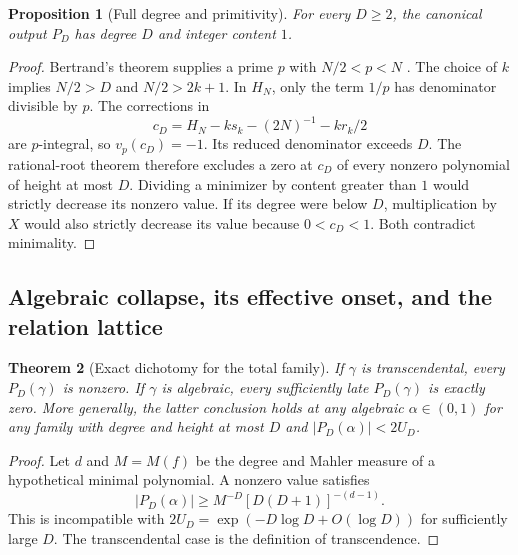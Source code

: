 \documentclass[11pt,a4paper]{article}
\newtheorem{theorem}{Theorem}[section]
\newtheorem{proposition}[theorem]{Proposition}
\theoremstyle{definition}
\theoremstyle{remark}
\numberwithin{equation}{section}
\begin{document}
\begin{proposition}[Full degree and primitivity]\label{inf:prop:full-degree}
For every $D\ge2$, the canonical output $P_D$ has degree $D$ and integer content $1$.
\end{proposition}
\begin{proof}
Bertrand's theorem supplies a prime $p$ with $N/2<p<N$ \cite{inf:Erdos}. The choice of $k$ implies $N/2>D$ and $N/2>2k+1$. In $H_N$, only the term $1/p$ has denominator divisible by $p$. The corrections in
\[
 c_D=H_N-ks_k-(2N)^{-1}-kr_k/2
\]
are $p$-integral, so $v_p(c_D)=-1$. Its reduced denominator exceeds $D$. The rational-root theorem therefore excludes a zero at $c_D$ of every nonzero polynomial of height at most $D$. Dividing a minimizer by content greater than $1$ would strictly decrease its nonzero value. If its degree were below $D$, multiplication by $X$ would also strictly decrease its value because $0<c_D<1$. Both contradict minimality.
\end{proof}

\subsection{Algebraic collapse, its effective onset, and the relation lattice}
\label{inf:sub:collapse}

\begin{theorem}[Exact dichotomy for the total family]\label{inf:thm:dichotomy}
If $\gamma$ is transcendental, every $P_D(\gamma)$ is nonzero. If $\gamma$ is algebraic, every sufficiently late $P_D(\gamma)$ is exactly zero. More generally, the latter conclusion holds at any algebraic $\alpha\in(0,1)$ for any family with degree and height at most $D$ and $|P_D(\alpha)|<2U_D$.
\end{theorem}
\begin{proof}
Let $d$ and $M=M(f)$ be the degree and Mahler measure of a hypothetical minimal polynomial. A nonzero value satisfies
\begin{equation}\label{inf:eq:collapse-bound}
 |P_D(\alpha)|\ge M^{-D}[D(D+1)]^{-(d-1)}.
\end{equation}
This is incompatible with $2U_D=\exp(-D\log D+O(\log D))$ for sufficiently large $D$. The transcendental case is the definition of transcendence.
\end{proof}
\end{document}
